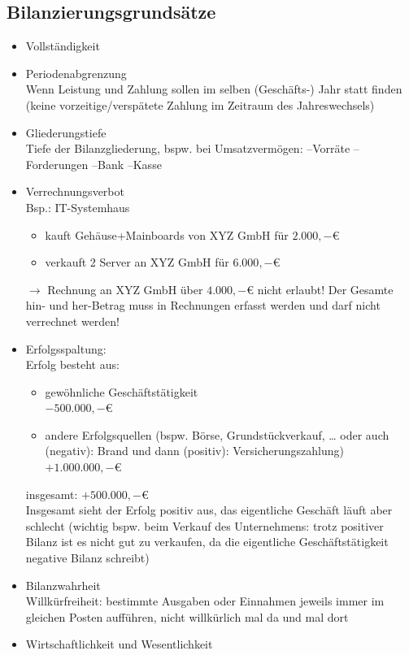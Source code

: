 \documentclass{scrreprt}
\begin{document}
\subsection{Bilanzierungsgrundsätze}
\begin{itemize}
\item Vollständigkeit
\item Periodenabgrenzung\\
Wenn Leistung und Zahlung sollen im selben (Geschäfts-) Jahr statt finden (keine vorzeitige/verspätete Zahlung im Zeitraum des Jahreswechsels)
\item Gliederungstiefe\\
Tiefe der Bilanzgliederung, bspw. bei Umsatzvermögen: --Vorräte --Forderungen --Bank --Kasse
\item Verrechnungsverbot\\
Bsp.: IT-Systemhaus 
\begin{itemize}
\item kauft Gehäuse+Mainboards von XYZ GmbH für $2.000,-$\euro{}
\item verkauft 2 Server an XYZ GmbH für $6.000,-$\euro{}
\end{itemize}
$\to$ Rechnung an XYZ GmbH über $4.000,-$\euro{} nicht erlaubt! Der Gesamte hin- und her-Betrag muss in Rechnungen erfasst werden und darf nicht verrechnet werden!
\item Erfolgsspaltung:\\
Erfolg besteht aus:
\begin{itemize}
\item gewöhnliche Geschäftstätigkeit\\
$-500.000,-$\euro{}
\item andere Erfolgsquellen (bspw. Börse, Grundstückverkauf, … oder auch (negativ): Brand und dann (positiv): Versicherungszahlung)\\
$+1.000.000,-$\euro{}
\end{itemize}
insgesamt: $+500.000,-$\euro{}\\
Insgesamt sieht der Erfolg positiv aus, das eigentliche Geschäft läuft aber schlecht (wichtig bspw. beim Verkauf des Unternehmens: trotz positiver Bilanz ist es nicht gut zu verkaufen, da die eigentliche Geschäftstätigkeit negative Bilanz schreibt)
\item Bilanzwahrheit\\
Willkürfreiheit: bestimmte Ausgaben oder Einnahmen jeweils immer im gleichen Posten aufführen, nicht willkürlich mal da und mal dort
\item Wirtschaftlichkeit und Wesentlichkeit\\

\end{itemize}
\end{document}
